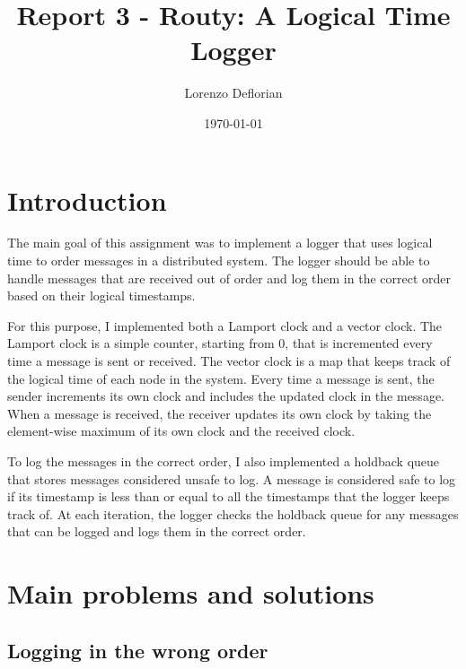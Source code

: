\documentclass[a4paper, 11pt]{article}
\title{Report 3 - Routy: A Logical Time Logger}
\author{Lorenzo Deflorian}
\date{\today{}}
\begin{document}
\maketitle

\section{Introduction}

The main goal of this assignment was to implement a logger that uses logical time to order messages in a distributed system. The logger should be able to handle messages that are received out of order and log them in the correct order based on their logical timestamps.

For this purpose, I implemented both a Lamport clock and a vector clock. The Lamport clock is a simple counter, starting from 0, that is incremented every time a message is sent or received. The vector clock is a map that keeps track of the logical time of each node in the system. Every time a message is sent, the sender increments its own clock and includes the updated clock in the message. When a message is received, the receiver updates its own clock by taking the element-wise maximum of its own clock and the received clock.

To log the messages in the correct order, I also implemented a holdback queue that stores messages considered unsafe to log. A message is considered safe to log if its timestamp is less than or equal to all the timestamps that the logger keeps track of. At each iteration, the logger checks the holdback queue for any messages that can be logged and logs them in the correct order.


\section{Main problems and solutions}

\subsection{Logging in the wrong order}
\end{document}

